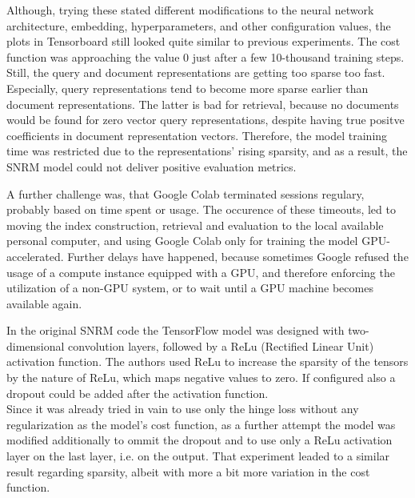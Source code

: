 Although, trying these stated different modifications to the neural network architecture, 
    embedding, hyperparameters, and other configuration values,
    the plots in Tensorboard still looked quite similar to previous experiments.
The cost function was approaching the value 0 just after a few 10-thousand training steps.
Still, the query and document representations are getting too sparse too fast.
Especially, query representations tend to become more sparse earlier than document representations.
The latter is bad for retrieval, because no documents would be found for zero vector query representations, 
    despite having true positve coefficients in document representation vectors.
Therefore, the model training time was restricted due to the representations' rising sparsity,
    and as a result, the SNRM model could not deliver positive evaluation metrics.

A further challenge was, that Google Colab terminated sessions regulary, probably based on time spent or usage.
The occurence of these timeouts, led to moving the index construction, retrieval and evaluation to the 
    local available personal computer, and using Google Colab only for training the model GPU-accelerated.
Further delays have happened, because sometimes Google refused the usage of a compute instance equipped with a GPU,
    and therefore enforcing the utilization of a non-GPU system, 
    or to wait until a GPU machine becomes available again.

In the original SNRM code the TensorFlow model was designed with two-dimensional convolution layers, 
    followed by a ReLu (Rectified Linear Unit) activation function.
The authors used ReLu to increase the sparsity of the tensors by the nature of ReLu,
    which maps negative values to zero.
If configured also a dropout could be added after the activation function.\\
Since it was already tried in vain to use only the hinge loss without any regularization as the model's cost function,
    as a further attempt the model was modified additionally to ommit the dropout
    and to use only a ReLu activation layer on the last layer, i.e. on the output.
That experiment leaded to a similar result regarding sparsity, albeit with more a bit more variation in the cost function.

